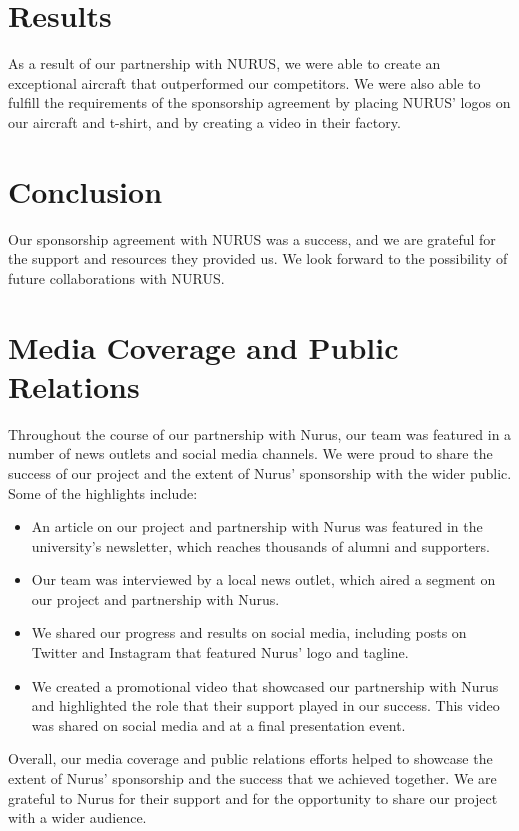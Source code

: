 \documentclass{article}
\begin{document}
\section{Results}

As a result of our partnership with NURUS, we were able to create an exceptional aircraft that outperformed our competitors. We were also able to fulfill the requirements of the sponsorship agreement by placing NURUS' logos on our aircraft and t-shirt, and by creating a video in their factory.


\section{Conclusion}

Our sponsorship agreement with NURUS was a success, and we are grateful for the support and resources they provided us. We look forward to the possibility of future collaborations with NURUS.

\section{Media Coverage and Public Relations}

Throughout the course of our partnership with Nurus, our team was featured in a number of news outlets and social media channels. We were proud to share the success of our project and the extent of Nurus' sponsorship with the wider public. Some of the highlights include:

\begin{itemize}
\item An article on our project and partnership with Nurus was featured in the university's newsletter, which reaches thousands of alumni and supporters.
\item Our team was interviewed by a local news outlet, which aired a segment on our project and partnership with Nurus.
\item We shared our progress and results on social media, including posts on Twitter and Instagram that featured Nurus' logo and tagline.
\item We created a promotional video that showcased our partnership with Nurus and highlighted the role that their support played in our success. This video was shared on social media and at a final presentation event.
\end{itemize}

Overall, our media coverage and public relations efforts helped to showcase the extent of Nurus' sponsorship and the success that we achieved together. We are grateful to Nurus for their support and for the opportunity to share our project with a wider audience.
\end{document}

